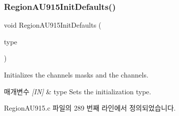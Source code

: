 \subsubsection{\texorpdfstring{Region\+A\+U915\+Init\+Defaults()}{RegionAU915InitDefaults()}}
{\footnotesize\ttfamily void Region\+A\+U915\+Init\+Defaults (\begin{DoxyParamCaption}\item[{\mbox{\hyperlink{group___r_e_g_i_o_n_gaddc73ae10673ec925724e7870363bda9}{Init\+Type\+\_\+t}}}]{type }\end{DoxyParamCaption})}



Initializes the channels masks and the channels. 


\begin{DoxyParams}{매개변수}
{\em \mbox{[}\+I\+N\mbox{]}} & type Sets the initialization type. \\
\hline
\end{DoxyParams}


Region\+A\+U915.\+c 파일의 289 번째 라인에서 정의되었습니다.


